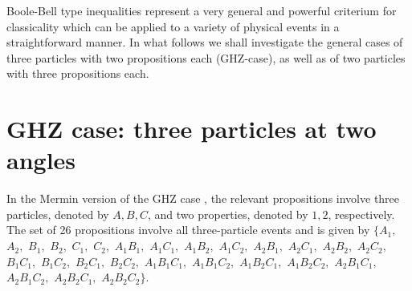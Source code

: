 Boole-Bell type inequalities represent a very general and powerful criterium for classicality
which can be applied to a variety of physical events in a straightforward manner.
In what follows we shall investigate the general cases of three particles with two propositions each (GHZ-case),
as well as of two particles with three propositions each.


\section{GHZ case: three particles at two angles}



In the Mermin version \cite{mermin,mermin-93} of the GHZ case \cite{ghz,ghsz},
the relevant propositions involve three particles,
denoted by $A,B,C$,
and two properties, denoted by $1,2$, respectively.
The set of 26 propositions involve all three-particle events and is given by
$\{
 A_1        ,$ $
 A_2        ,$ $
 B_1        ,$ $
 B_2        ,$ $
 C_1        ,$ $
 C_2        ,$ $
 A_1B_1     ,$ $
 A_1C_1     ,$ $
 A_1B_2     ,$ $
 A_1C_2     ,$ $
 A_2B_1     ,$ $
 A_2C_1     ,$ $
 A_2B_2     ,$ $
 A_2C_2     ,$ $
 B_1C_1     ,$ $
 B_1C_2     ,$ $
 B_2C_1     ,$ $
 B_2C_2     ,$ $
 A_1B_1C_1  ,$ $
 A_1B_1C_2  ,$ $
 A_1B_2C_1  ,$ $
 A_1B_2C_2  ,$ $
 A_2B_1C_1  ,$ $
 A_2B_1C_2  ,$ $
 A_2B_2C_1  ,$ $
 A_2B_2C_2
\}$.


